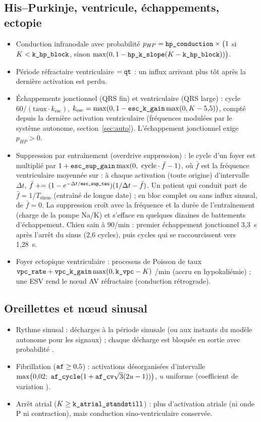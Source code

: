 \documentclass[10pt,a4paper]{article}
\newcommand{\vp}[1]{\text{\texttt{\detokenize{#1}}}}
\begin{document}
\subsection{His--Purkinje, ventricule, échappements, ectopie}
\begin{itemize}
\item Conduction infranodale avec probabilité $p_{HP} = \vp{hp_conduction}\times\bigl(1$ si $K < \vp{k_hp_block}$, sinon $\max(0, 1 - \vp{hp_k_slope}(K - \vp{k_hp_block}))\bigr)$.
\item Période réfractaire ventriculaire $= \vp{qt}$ : un influx arrivant plus tôt après la dernière activation est perdu.
\item Échappements jonctionnel (QRS fin) et ventriculaire (QRS large) : cycle $60/(\text{taux}\cdot k_\text{esc})$, $k_\text{esc} = \max(0, 1 - \vp{esc_k_gain}\max(0, K - 5{,}5))$, compté depuis la dernière activation ventriculaire (fréquences modulées par le système autonome, section~\ref{sec:auto}). L'échappement jonctionnel exige $p_{HP} > 0$.
\item Suppression par entraînement (overdrive suppression) : le cycle d'un foyer est multiplié par $1 + \vp{esc_sup_gain}\max(0,\ \text{cycle}\cdot\bar f - 1)$, où $\bar f$ est la fréquence ventriculaire moyennée sur \vp{esc_sup_tau} : à chaque activation (toute origine) d'intervalle $\Delta t$, $\bar f \mathrel{+}= (1 - e^{-\Delta t/\vp{esc_sup_tau}})(1/\Delta t - \bar f)$. Un patient qui conduit part de $\bar f = 1/T_\text{sinus}$ (entraîné de longue date) ; en bloc complet ou sans influx sinusal, de $\bar f = 0$. La suppression croît avec la fréquence et la durée de l'entraînement (charge de la pompe Na/K) et s'efface en quelques dizaines de battements d'échappement. Chien sain à 90/min : premier échappement jonctionnel 3,3~s après l'arrêt du sinus (2,6 cycles), puis cycles qui se raccourcissent vers 1,28~s.
\item Foyer ectopique ventriculaire : processus de Poisson de taux $\vp{vpc_rate} + \vp{vpc_k_gain}\max(0, \vp{k_vpc} - K)$ /min (accru en hypokaliémie) ; une ESV rend le nœud AV réfractaire (conduction rétrograde).
\end{itemize}

\subsection{Oreillettes et nœud sinusal}
\begin{itemize}
\item Rythme sinusal : décharges à la période sinusale (ou aux instants du modèle autonome pour les signaux) ; chaque décharge est bloquée en sortie avec probabilité \vp{sa_block}.
\item Fibrillation ($\vp{af} \ge 0{,}5$) : activations désorganisées d'intervalle $\max\bigl(0{,}02;\ \vp{af_cycle}(1 + \vp{af_cv}\sqrt3(2u - 1))\bigr)$, $u$ uniforme (coefficient de variation \vp{af_cv}).
\item Arrêt atrial ($K \ge \vp{k_atrial_standstill}$) : plus d'activation atriale (ni onde P ni contraction), mais conduction sino-ventriculaire conservée.
\end{itemize}
\end{document}

